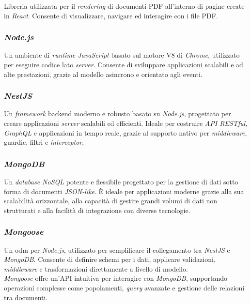 Libreria utilizzata per il \textit{rendering} di documenti PDF all’interno di pagine create in \textit{React}.
Consente di visualizzare, navigare ed interagire con i file PDF.

\subsubsection{\textit{Node.js}}

Un ambiente di \textit{runtime JavaScript} basato sul motore V8 di \textit{Chrome}, utilizzato per eseguire codice lato \textit{server}. 
Consente di sviluppare applicazioni scalabili e ad alte prestazioni, grazie al modello asincrono e orientato agli eventi.

\subsubsection{\textit{NestJS}}

Un \textit{framework} \gls{backend} moderno e robusto basato su \textit{Node.js}, progettato per creare applicazioni \textit{server} scalabili ed efficienti.
Ideale per costruire \textit{API RESTful, GraphQL} e applicazioni in tempo reale, grazie al supporto nativo per \textit{middleware}, guardie, filtri e \textit{interceptor}.

\subsubsection{\textit{MongoDB}}

Un \textit{database NoSQL} potente e flessibile progettato per la gestione di dati sotto forma di documenti \textit{JSON-like}. 
È ideale per applicazioni moderne grazie alla sua scalabilità orizzontale, alla capacità di gestire grandi volumi di dati non strutturati e alla facilità di integrazione con diverse tecnologie.

\subsubsection{\textit{Mongoose}}

Un \gls{odm} per \textit{Node.js}, utilizzato per semplificare il collegamento tra \textit{NestJS} e \textit{MongoDB}. Consente di definire schemi per i dati, applicare validazioni, \textit{middleware} e trasformazioni direttamente a livello di modello. \\
\textit{Mongoose} offre un'API intuitiva per interagire con \textit{MongoDB}, supportando operazioni complesse come popolamenti, \textit{query} avanzate e gestione delle relazioni tra documenti. 


